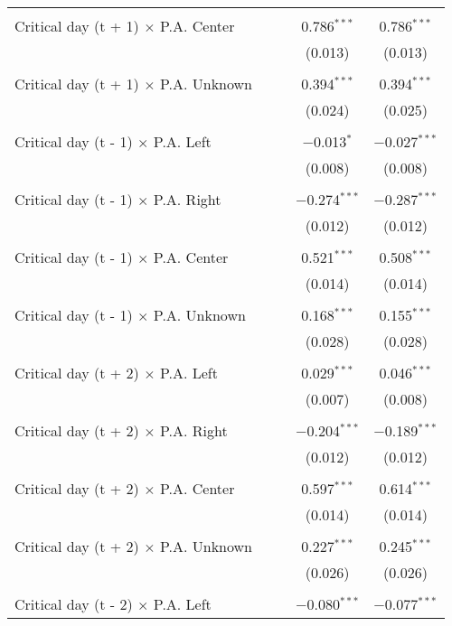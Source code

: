 \documentclass[
]{article}
\begin{document}
\begin{table}[!htbp]
{\begin{tabular}{@{\extracolsep{5pt}}lcccc}
  & & & & \\ 
 Critical day (t + 1) $\times$ P.A. Center &  &  & 0.786$^{***}$ & 0.786$^{***}$ \\ 
  &  &  & (0.013) & (0.013) \\ 
  & & & & \\ 
 Critical day (t + 1) $\times$ P.A. Unknown &  &  & 0.394$^{***}$ & 0.394$^{***}$ \\ 
  &  &  & (0.024) & (0.025) \\ 
  & & & & \\ 
 Critical day (t - 1) $\times$ P.A. Left &  &  & $-$0.013$^{*}$ & $-$0.027$^{***}$ \\ 
  &  &  & (0.008) & (0.008) \\ 
  & & & & \\ 
 Critical day (t - 1) $\times$ P.A. Right &  &  & $-$0.274$^{***}$ & $-$0.287$^{***}$ \\ 
  &  &  & (0.012) & (0.012) \\ 
  & & & & \\ 
 Critical day (t - 1) $\times$ P.A. Center &  &  & 0.521$^{***}$ & 0.508$^{***}$ \\ 
  &  &  & (0.014) & (0.014) \\ 
  & & & & \\ 
 Critical day (t - 1) $\times$ P.A. Unknown &  &  & 0.168$^{***}$ & 0.155$^{***}$ \\ 
  &  &  & (0.028) & (0.028) \\ 
  & & & & \\ 
 Critical day (t + 2) $\times$ P.A. Left &  &  & 0.029$^{***}$ & 0.046$^{***}$ \\ 
  &  &  & (0.007) & (0.008) \\ 
  & & & & \\ 
 Critical day (t + 2) $\times$ P.A. Right &  &  & $-$0.204$^{***}$ & $-$0.189$^{***}$ \\ 
  &  &  & (0.012) & (0.012) \\ 
  & & & & \\ 
 Critical day (t + 2) $\times$ P.A. Center &  &  & 0.597$^{***}$ & 0.614$^{***}$ \\ 
  &  &  & (0.014) & (0.014) \\ 
  & & & & \\ 
 Critical day (t + 2) $\times$ P.A. Unknown &  &  & 0.227$^{***}$ & 0.245$^{***}$ \\ 
  &  &  & (0.026) & (0.026) \\ 
  & & & & \\ 
 Critical day (t - 2) $\times$ P.A. Left &  &  & $-$0.080$^{***}$ & $-$0.077$^{***}$ \\ 

\end{tabular}}
\end{table}
\end{document}
